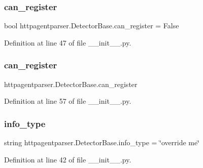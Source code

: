 \subsubsection{\texorpdfstring{can\+\_\+register}{can\_register}\hspace{0.1cm}{\footnotesize\ttfamily [1/2]}}
{\footnotesize\ttfamily bool httpagentparser.\+Detector\+Base.\+can\+\_\+register = False\hspace{0.3cm}{\ttfamily [static]}}



Definition at line 47 of file \+\_\+\+\_\+init\+\_\+\+\_\+.\+py.

\hypertarget{classhttpagentparser_1_1_detector_base_a5b6f87414a82c136adf833031f013593}{}\label{classhttpagentparser_1_1_detector_base_a5b6f87414a82c136adf833031f013593} 
\subsubsection{\texorpdfstring{can\+\_\+register}{can\_register}\hspace{0.1cm}{\footnotesize\ttfamily [2/2]}}
{\footnotesize\ttfamily httpagentparser.\+Detector\+Base.\+can\+\_\+register}



Definition at line 57 of file \+\_\+\+\_\+init\+\_\+\+\_\+.\+py.

\hypertarget{classhttpagentparser_1_1_detector_base_a46d36e7cd15f3d1208548ba393826a22}{}\label{classhttpagentparser_1_1_detector_base_a46d36e7cd15f3d1208548ba393826a22} 
\subsubsection{\texorpdfstring{info\+\_\+type}{info\_type}}
{\footnotesize\ttfamily string httpagentparser.\+Detector\+Base.\+info\+\_\+type = \char`\"{}override me\char`\"{}\hspace{0.3cm}{\ttfamily [static]}}



Definition at line 42 of file \+\_\+\+\_\+init\+\_\+\+\_\+.\+py.

